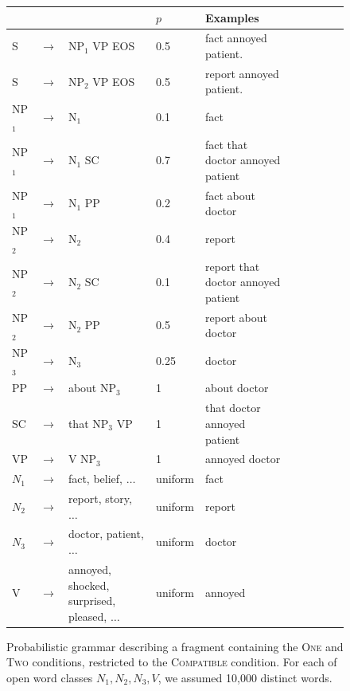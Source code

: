 \begin{figure}
    \centering
    \begin{tabular}{|lll|l|l|lllll}
    \hline
  &              &          & $p$ & Examples \\ \hline\hline
S &$\rightarrow$ & NP$_1$ VP EOS & 0.5 &  fact annoyed  patient.\\
S &$\rightarrow$ & NP$_2$ VP EOS & 0.5 &  report annoyed  patient.\\
\hline
NP$_1$ & $\rightarrow$ & N$_1$ &  0.1 &  fact \\
NP$_1$ & $\rightarrow$ & N$_1$ SC &  0.7 &  fact that doctor annoyed  patient\\
NP$_1$ &$\rightarrow$ & N$_1$ PP &  0.2 &  fact about  doctor\\
\hline
NP$_2$ & $\rightarrow$ & N$_2$ &  0.4 &  report \\
NP$_2$ & $\rightarrow$ & N$_2$ SC &  0.1 &  report that doctor annoyed patient\\
NP$_2$ &$\rightarrow$ & N$_2$ PP &  0.5 &  report about doctor\\
\hline
NP$_3$ &$\rightarrow$ & N$_3$ & 0.25 & doctor\\
\hline
PP &$\rightarrow$ & about NP$_3$ & 1 & about doctor\\
\hline
SC &$\rightarrow$ & that NP$_3$ VP & 1 & that doctor annoyed patient\\
\hline
VP &$\rightarrow$ & V NP$_3$ & 1 & annoyed doctor\\
\hline
$N_1$ & $\rightarrow$ & fact, belief, $\dots$ & uniform & fact \\
$N_2$ & $\rightarrow$ & report, story, $\dots$ & uniform & report \\
$N_3$ & $\rightarrow$ & doctor, patient, $\dots$ & uniform & doctor \\
V & $\rightarrow$ & annoyed, shocked, surprised, pleased, $\dots$ & uniform & annoyed \\
\hline
    \end{tabular}
    \caption{Probabilistic grammar describing a fragment containing the \textsc{One} and \textsc{Two} conditions, restricted to the \textsc{Compatible} condition. For each of open word classes $N_1, N_2, N_3, V$, we assumed 10,000 distinct words.}
    \label{fig:grammar}
\end{figure}



